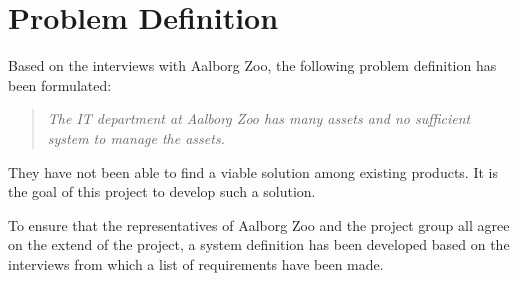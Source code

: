 \section{Problem Definition}

Based on the interviews with Aalborg Zoo, the following problem definition has been formulated:

\begin{quote}
\textit{The IT department at Aalborg Zoo has many assets and no sufficient system to manage the assets.}
\end{quote}

They have not been able to find a viable solution among existing products. It is the goal of this project to develop such a solution. 
\par
To ensure that the representatives of Aalborg Zoo and the project group all agree on the extend of the project, a system definition has been developed based on the interviews from which a list of requirements have been made.